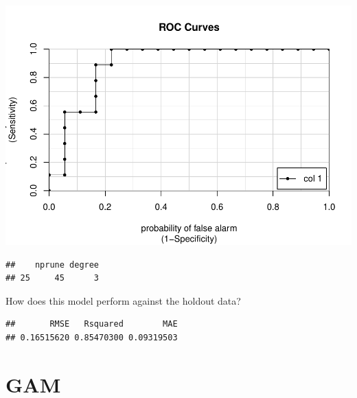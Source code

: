 \documentclass[
]{book}
\newenvironment{Shaded}{\begin{snugshade}}{\end{snugshade}}
\newcommand{\DataTypeTok}[1]{\textcolor[rgb]{0.13,0.29,0.53}{#1}}
\newcommand{\KeywordTok}[1]{\textcolor[rgb]{0.13,0.29,0.53}{\textbf{#1}}}
\newcommand{\NormalTok}[1]{#1}
\newcommand{\OperatorTok}[1]{\textcolor[rgb]{0.81,0.36,0.00}{\textbf{#1}}}
\begin{document}
\includegraphics{data-sci_files/figure-latex/unnamed-chunk-46-1.pdf}

\begin{Shaded}
\end{Shaded}

\begin{verbatim}
##    nprune degree
## 25     45      3
\end{verbatim}

How does this model perform against the holdout data?

\begin{Shaded}
\end{Shaded}

\begin{verbatim}
##       RMSE   Rsquared        MAE 
## 0.16515620 0.85470300 0.09319503
\end{verbatim}

\hypertarget{gam}{%
\section{GAM}\label{gam}}
\end{document}
